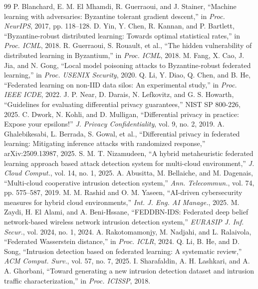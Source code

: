 \documentclass{ieeeaccess}
\theoremstyle{plain}
\theoremstyle{definition}
\theoremstyle{remark}
\begin{document}
\begin{thebibliography}{99}
 P. Blanchard, E. M. El Mhamdi, R. Guerraoui, and J. Stainer, ``Machine learning with adversaries: Byzantine tolerant gradient descent,'' in \textit{Proc. NeurIPS}, 2017, pp. 118--128.
 D. Yin, Y. Chen, R. Kannan, and P. Bartlett, ``Byzantine-robust distributed learning: Towards optimal statistical rates,'' in \textit{Proc. ICML}, 2018.
 R. Guerraoui, S. Rouault, et al., ``The hidden vulnerability of distributed learning in Byzantium,'' in \textit{Proc. ICML}, 2018.
 M. Fang, X. Cao, J. Jia, and N. Gong, ``Local model poisoning attacks to Byzantine-robust federated learning,'' in \textit{Proc. USENIX Security}, 2020.
 Q. Li, Y. Diao, Q. Chen, and B. He, ``Federated learning on non-IID data silos: An experimental study,'' in \textit{Proc. IEEE ICDE}, 2022.
 J. P. Near, D. Darais, N. Lefkovitz, and G. S. Howarth, ``Guidelines for evaluating differential privacy guarantees,'' NIST SP 800-226, 2025.
 C. Dwork, N. Kohli, and D. Mulligan, ``Differential privacy in practice: Expose your epsilons!'' \textit{J. Privacy Confidentiality}, vol. 9, no. 2, 2019.
 A. Ghalebikesabi, L. Berrada, S. Gowal, et al., ``Differential privacy in federated learning: Mitigating inference attacks with randomized response,'' arXiv:2509.13987, 2025.
 S. M. T. Nizamudeen, ``A hybrid metaheuristic federated learning approach based attack detection system for multi-cloud environment,'' \textit{J. Cloud Comput.}, vol. 14, no. 1, 2025.
 A. Abusitta, M. Bellaiche, and M. Dagenais, ``Multi-cloud cooperative intrusion detection system,'' \textit{Ann. Telecommun.}, vol. 74, pp. 575--587, 2019.
 M. M. Rashid and O. M. Yaseen, ``AI-driven cybersecurity measures for hybrid cloud environments,'' \textit{Int. J. Eng. AI Manage.}, 2025.
 M. Zaydi, H. El Alami, and A. Beni-Hssane, ``FEDDBN-IDS: Federated deep belief network-based wireless network intrusion detection system,'' \textit{EURASIP J. Inf. Secur.}, vol. 2024, no. 1, 2024.
 A. Rakotomamonjy, M. Nadjahi, and L. Ralaivola, ``Federated Wasserstein distance,'' in \textit{Proc. ICLR}, 2024.
 Q. Li, B. He, and D. Song, ``Intrusion detection based on federated learning: A systematic review,'' \textit{ACM Comput. Surv.}, vol. 57, no. 7, 2025.
 I. Sharafaldin, A. H. Lashkari, and A. A. Ghorbani, ``Toward generating a new intrusion detection dataset and intrusion traffic characterization,'' in \textit{Proc. ICISSP}, 2018.

\end{thebibliography}
\end{document}
